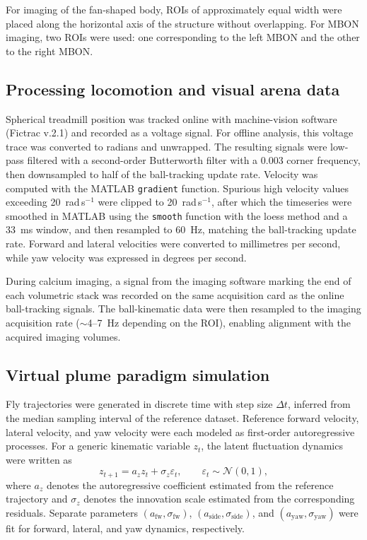 For imaging of the fan-shaped body, ROIs of approximately equal width were placed along the horizontal axis of the structure without overlapping. For MBON imaging, two ROIs were used: one corresponding to the left MBON and the other to the right MBON.

\subsection{Processing locomotion and visual arena data}

Spherical treadmill position was tracked online with machine-vision software (Fictrac v.2.1) and recorded as a voltage signal. For offline analysis, this voltage trace was converted to radians and unwrapped. The resulting signals were low-pass filtered with a second-order Butterworth filter with a 0.003 corner frequency, then downsampled to half of the ball-tracking update rate. Velocity was computed with the MATLAB \texttt{gradient} function. Spurious high velocity values exceeding 20~rad\,s$^{-1}$ were clipped to 20~rad\,s$^{-1}$, after which the timeseries were smoothed in MATLAB using the \texttt{smooth} function with the loess method and a 33~ms window, and then resampled to 60~Hz, matching the ball-tracking update rate. Forward and lateral velocities were converted to millimetres per second, while yaw velocity was expressed in degrees per second.

During calcium imaging, a signal from the imaging software marking the end of each volumetric stack was recorded on the same acquisition card as the online ball-tracking signals. The ball-kinematic data were then resampled to the imaging acquisition rate ($\sim$4--7~Hz depending on the ROI), enabling alignment with the acquired imaging volumes.

\subsection{Virtual plume paradigm simulation}

Fly trajectories were generated in discrete time with step size \(\Delta t\), inferred from the median sampling interval of the reference dataset. Reference forward velocity, lateral velocity, and yaw velocity were each modeled as first-order autoregressive processes. For a generic kinematic variable \(z_t\), the latent fluctuation dynamics were written as
\[
z_{t+1} = a_z z_t + \sigma_z \varepsilon_t,\qquad \varepsilon_t \sim \mathcal{N}(0,1),
\]
where \(a_z\) denotes the autoregressive coefficient estimated from the reference trajectory and \(\sigma_z\) denotes the innovation scale estimated from the corresponding residuals. Separate parameters \((a_{\mathrm{fw}},\sigma_{\mathrm{fw}})\), \((a_{\mathrm{side}},\sigma_{\mathrm{side}})\), and \((a_{\mathrm{yaw}},\sigma_{\mathrm{yaw}})\) were fit for forward, lateral, and yaw dynamics, respectively.

